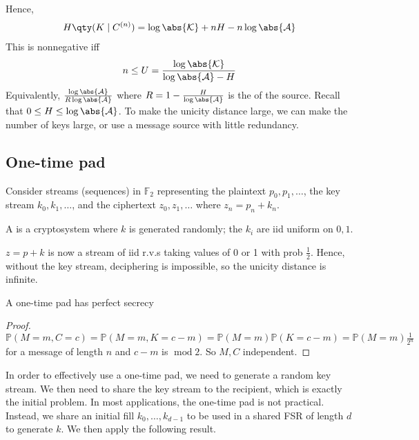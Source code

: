 Hence,
\begin{align*}
    H\qty(K \mid C^{(n)}) = \log \abs{\mathcal K} + nH - n \log \abs{\mathcal A}
\end{align*}
This is nonnegative iff
\begin{align*}
    n \leq U = \frac{\log \abs{\mathcal K}}{\log \abs{\mathcal A} - H}
\end{align*}
Equivalently, $\frac{\log \abs{\mathcal A}}{R\log \abs{\mathcal A}}$ where $R = 1 - \frac{H}{\log \abs{\mathcal A}}$ is the  of the source.
Recall that $0 \leq H \leq \log \abs{\mathcal A}$.
To make the unicity distance large, we can make the number of keys large, or use a message source with little redundancy.

\subsection{One-time pad}
Consider streams (sequences) in $\mathbb F_2$ representing the plaintext $p_0, p_1, \dots$, the key stream $k_0, k_1, \dots$, and the ciphertext $z_0, z_1, \dots$ where $z_n = p_n + k_n$.

\begin{definition}
    A  is a cryptosystem where $k$ is generated randomly; the $k_i$ are iid uniform on $0, 1$.
\end{definition}

$z = p + k$ is now a stream of iid r.v.s taking values of 0 or 1 with prob $\frac{1}{2}$.
Hence, without the key stream, deciphering is impossible, so the unicity distance is infinite.

\begin{lemma}
    A one-time pad has perfect secrecy
\end{lemma}

\begin{proof}
    $\mathbb{P}(M = m, C = c) = \mathbb{P}(M = m, K = c - m) = \mathbb{P}(M = m) \mathbb{P}(K = c - m) = \mathbb{P}(M = m) \frac{1}{2^n}$ for a message of length $n$ and $c - m$ is $\operatorname{mod} 2$.
    So $M, C$ independent.
\end{proof}

In order to effectively use a one-time pad, we need to generate a random key stream.
We then need to share the key stream to the recipient, which is exactly the initial problem.
In most applications, the one-time pad is not practical. \\
Instead, we share an initial fill $k_0, \dots, k_{d-1}$ to be used in a shared FSR of length $d$ to generate $k$.
We then apply the following result.

